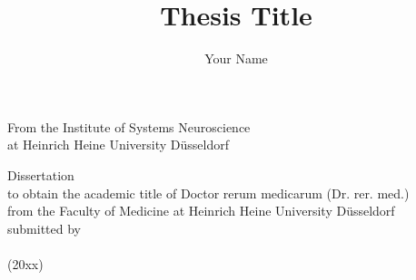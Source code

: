\documentclass[crop=false]{standalone}
\begin{document}
\title{Thesis Title}
\author{Your Name}

\makeatletter
\begin{titlepage}
\begin{center}

\vspace*{2\baselineskip}
From the Institute of Systems Neuroscience\\
at Heinrich Heine University Düsseldorf

\vspace*{4\baselineskip}

\vfill

{\Large \bfseries \@title \par}
\vfill

\vspace*{2\baselineskip}

Dissertation\\
\vspace*{3\baselineskip}
to obtain the academic title of Doctor rerum medicarum (Dr. rer. med.)\\ %
\vspace*{0.5\baselineskip}
from the Faculty of Medicine at Heinrich Heine University Düsseldorf\\


\vspace*{6\baselineskip}
submitted by\\

\vspace*{\baselineskip}
{\large \textbf{\@author}}
\vspace*{0.5\baselineskip}
\\{\large (20xx)} %
\vspace*{3\baselineskip}


\end{center}
\end{titlepage}
\makeatother
\end{document}
